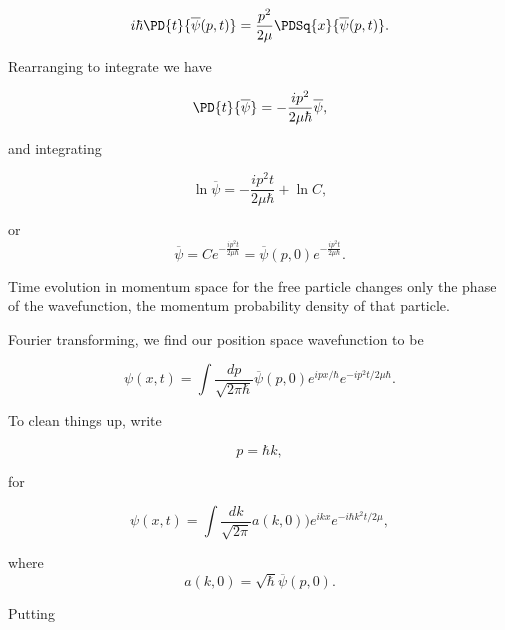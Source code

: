 \begin{equation}\label{eqn:qmTwoL21:130}
i \hbar \PD{t}{\overline{\psi}(p,t)} = \frac{p^2}{2 \mu} \PDSq{x}{\overline{\psi}(p, t)}.
\end{equation}

Rearranging to integrate we have

\begin{equation}\label{eqn:qmTwoL21:150}
\PD{t}{\overline{\psi}} = -\frac{i p^2}{2 \mu \hbar} \overline{\psi},
\end{equation}

and integrating

\begin{equation}\label{eqn:qmTwoL21:170}
\ln \overline{\psi} = -\frac{i p^2 t}{2 \mu \hbar} + \ln C,
\end{equation}

or 
\begin{equation}\label{eqn:qmTwoL21:190}
\overline{\psi} = C e^{-\frac{i p^2 t}{2 \mu \hbar}} = \overline{\psi}(p, 0) e^{-\frac{i p^2 t}{2 \mu \hbar}}.
\end{equation}

Time evolution in momentum space for the free particle changes only the phase of the wavefunction, the momentum probability density of that particle.

Fourier transforming, we find our position space wavefunction to be

\begin{equation}\label{eqn:qmTwoL21:210}
\psi(x, t) = \int \frac{dp}{\sqrt{2 \pi \hbar}} \overline{\psi}(p, 0) e^{i p x/\hbar} e^{-i p^2 t/2 \mu \hbar}.
\end{equation}

To clean things up, write

\begin{equation}\label{eqn:qmTwoL21:230}
p = \hbar k,
\end{equation}

for

\begin{equation}\label{eqn:qmTwoL21:250}
\psi(x, t) = \int \frac{dk}{\sqrt{2 \pi}} a(k, 0) ) e^{i k x} e^{-i \hbar k^2 t/2 \mu},
\end{equation}

where
\begin{equation}\label{eqn:qmTwoL21:270}
a(k, 0) = \sqrt{\hbar} \overline{\psi}(p, 0).
\end{equation}

Putting

